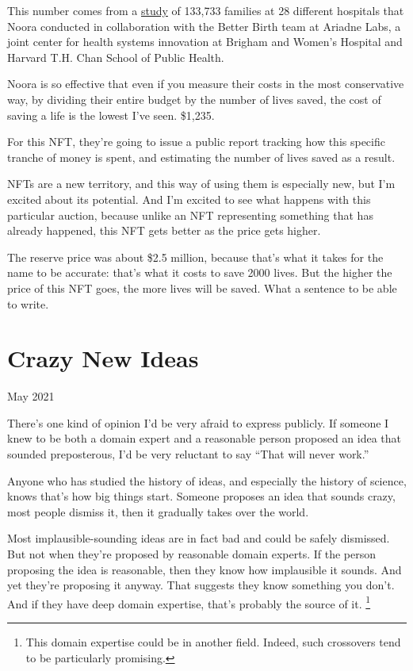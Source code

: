\documentclass[12pt]{book}
\begin{document}
This number comes from a \href{http://bit.ly/NFT-research}{study} of
133,733 families at 28 different hospitals that Noora conducted in
collaboration with the Better Birth team at Ariadne Labs, a joint center
for health systems innovation at Brigham and Women's Hospital and
Harvard T.H. Chan School of Public Health.

Noora is so effective that even if you measure their costs in the most
conservative way, by dividing their entire budget by the number of lives
saved, the cost of saving a life is the lowest I've seen. \$1,235.

For this NFT, they're going to issue a public report tracking how this
specific tranche of money is spent, and estimating the number of lives
saved as a result.

NFTs are a new territory, and this way of using them is especially new,
but I'm excited about its potential. And I'm excited to see what happens
with this particular auction, because unlike an NFT representing
something that has already happened, this NFT gets better as the price
gets higher.

The reserve price was about \$2.5 million, because that's what it takes
for the name to be accurate: that's what it costs to save 2000 lives.
But the higher the price of this NFT goes, the more lives will be saved.
What a sentence to be able to write.
\chapter{Crazy New Ideas}

May 2021

There's one kind of opinion I'd be very afraid to express publicly. If
someone I knew to be both a domain expert and a reasonable person
proposed an idea that sounded preposterous, I'd be very reluctant to say
``That will never work.''

Anyone who has studied the history of ideas, and especially the history
of science, knows that's how big things start. Someone proposes an idea
that sounds crazy, most people dismiss it, then it gradually takes over
the world.

Most implausible-sounding ideas are in fact bad and could be safely
dismissed. But not when they're proposed by reasonable domain experts.
If the person proposing the idea is reasonable, then they know how
implausible it sounds. And yet they're proposing it anyway. That
suggests they know something you don't. And if they have deep domain
expertise, that's probably the source of it. \footnote{This domain expertise could be in another field. Indeed, such
crossovers tend to be particularly promising.}
\end{document}
